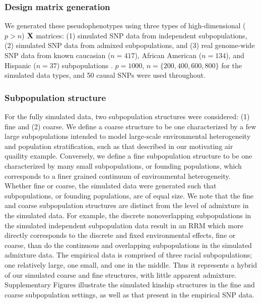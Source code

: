 


\subsubsection{Design matrix generation}
We generated these pseudophenotypes using three types of high-dimensional ($p > n$) $\textbf{X}$ matrices: (1) simulated SNP data from independent subpopulations, (2) simulated SNP data from admixed subpopulations, and (3) real genome-wide SNP data from known caucasian ($n = 417$), African American ($n = 134$), and Hispanic ($n = 37$) subpopulations . $p = 1000$, $n = \{200, 400, 600, 800 \}$ for the simulated data types, and 50 causal SNPs were used throughout. 

\subsubsection{Subpopulation structure}
For the fully simulated data, two subpopulation structures were considered: (1) fine and (2) coarse. We define a coarse structure to be one characterized by a few large subpopulations intended to model large-scale environmental heterogeneity and population stratification, such as that described in our motivating air quaility example. Conversely, we define a fine subpopulation structure to be one characterized by many small subpopulations, or founding populations, which corresponds to a finer grained continuum of environmental heterogeneity. Whether fine or coarse, the simulated data were generated such that subpopulations, or founding populations, are of equal size. We note that the fine and coarse subpopulation structures are distinct from the level of admixture in the simulated data. For example, the discrete nonoverlapping subpopulations in the simulated independent subpopulation data result in an RRM which more directly corresponds to the discrete and fixed environmental effects, fine or coarse, than do the continuous and overlapping subpopulations in the simulated admixture data. The empirical data is comprised of three racial subpopulations; one relatively large, one small, and one in the middle. Thus it represents a hybrid of our simulated coarse and fine structures, with little apparent admixture. Supplementary Figures  illustrate the simulated kinship structures in the fine and coarse subpopulation settings, as well as that present in the empirical SNP data. 

